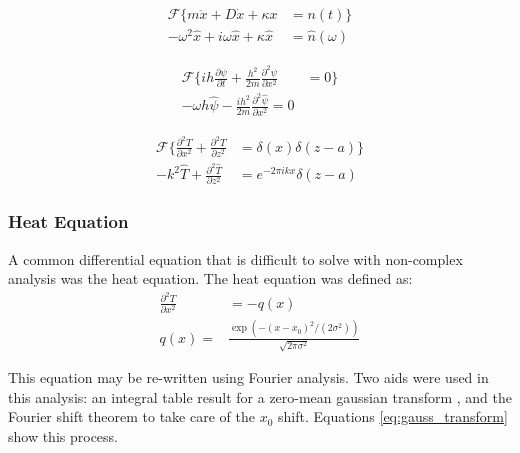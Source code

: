 \documentclass[twocolumn]{article}
\begin{document}
\begin{equation}
\begin{split}
\mathcal{F} \{ m\ddot{x} + D\dot{x} + \kappa x &= n(t) \} \\
-\omega^2 \hat{x} +i\omega \hat{x} + \kappa\hat{x} &= \hat{n}(\omega)
\end{split}
\end{equation}

\begin{equation}
\begin{split}
\mathcal{F} \{ih \frac{\partial \psi}{\partial t} + \frac{h^2}{2m} \frac{\partial^2 \psi}{\partial x^2} &= 0 \} \\
-\omega h \hat{\psi} - \frac{ih^2}{2m} \frac{\partial^2 \hat{\psi}}{\partial x^2} = 0
\end{split}
\end{equation}

\begin{equation}
\begin{split}
\mathcal{F} \{ \frac{\partial^2 T}{\partial x^2} + \frac{\partial^2 T}{\partial z^2} &= \delta (x) \delta (z - a) \}\\
-k^2 \hat{T} + \frac{\partial^2 \hat{T}}{\partial z^2} &= e^{-2\pi ik x} \delta (z - a)
\end{split}
\end{equation}

\subsubsection{Heat Equation}
A common differential equation that is difficult to solve with non-complex analysis was the heat equation. The heat equation was defined as:
\begin{equation}
\begin{split}
\frac{\partial^2 T}{\partial x^2} &= -q(x)\\
q(x) =& \frac{\exp(-(x-x_0)^2/(2\sigma^2))}{\sqrt{2\pi\sigma^2}}
\end{split}
\end{equation}

This equation may be re-written using Fourier analysis. Two aids were used in this analysis: an integral table result for a zero-mean gaussian transform \cite{gauss_trans}, and the Fourier shift theorem to take care of the $x_0$ shift. Equations \ref{eq:gauss_transform} show this process.
\end{document}
